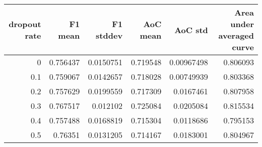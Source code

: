 \begin{tabular}{rrrrrr}
\toprule
   dropout rate &   F1 mean &   F1 stddev &   AoC mean &    AoC std &   Area under averaged curve \\
\midrule
            0   &  0.756437 &   0.0150751 &   0.719548 & 0.00967498 &                    0.806093 \\
            0.1 &  0.759067 &   0.0142657 &   0.718028 & 0.00749939 &                    0.803368 \\
            0.2 &  0.757629 &   0.0199559 &   0.717309 & 0.0167461  &                    0.807958 \\
            0.3 &  0.767517 &   0.012102  &   0.725084 & 0.0205084  &                    0.815534 \\
            0.4 &  0.757488 &   0.0168819 &   0.715304 & 0.0118686  &                    0.795153 \\
            0.5 &  0.76351  &   0.0131205 &   0.714167 & 0.0183001  &                    0.804967 \\
\bottomrule
\end{tabular}